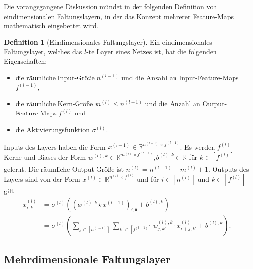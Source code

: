 \documentclass[paper=a4, 	%
		fontsize=11pt,
		abstract=true, 	%
		headsepline, 	%
		notitlepage	%
		]{scrartcl}
\theoremstyle{definition}
\newtheorem{definition}[theorem]{Definition}
\newcommand{\R}{\mathbb{R}}
\newcommand{\fNat}[1]{[ #1 ]}
\begin{document}
Die vorangegangene Diskussion mündet in der folgenden Definition von eindimensionalen Faltungslayern, in der das Konzept mehrerer Feature-Maps mathematisch eingebettet wird.

\begin{definition}[Eindimensionales Faltungslayer]\label{def:one-dimensional-conv-layer}
    Ein eindimensionales Faltungslayer, welches das $l$-te Layer eines Netzes ist, hat die folgenden Eigenschaften:
    \begin{itemize}
        \item die räumliche Input-Größe $n^{(l-1)}$ und die Anzahl an Input-Feature-Maps $f^{(l-1)}$,
        \item die räumliche Kern-Größe $m^{(l)}\leq n^{(l-1)}$ und die Anzahl an Output-Feature-Maps $f^{(l)}$ und
        \item die Aktivierungsfunktion $\sigma^{(l)}$.
    \end{itemize}
    Inputs des Layers haben die Form $x^{(l-1)}\in\R^{n^{(l-1)} \times f^{(l-1)}}$.
    Es werden $f^{(l)}$ Kerne und Biases der Form $w^{(l),k}\in\R^{m^{(l)} \times f^{(l-1)}}, b^{(l),k}\in\R$ für  $k\in \fNat{f^{(l)}}$ gelernt.
    Die räumliche Output-Größe ist $n^{(l)} = n^{(l-1)}-  m^{(l)} + 1$.
    Outputs des Layers sind von der Form $x^{(l)}\in \R^{n^{(l)}\times f^{(l)}}$ und für $i\in\fNat{n^{(l)}}$ und $k\in\fNat{f^{(l)}}$ gilt
    \begin{align*}
        x^{(l)}_{i,k}
        &=  \sigma^{(l)}\left( (w^{(l),k} \star x^{(l-1)})_{i,0} + b^{(l),k} \right)\\
        &= \sigma^{(l)} \left( 
            \sum_{j \in \fNat{n^{(l-1)}}} \sum_{k'\in \fNat{f^{(l-1)}}}
            w^{(l),k}_{j,k'} \cdot x^{(l)}_{i+j, k'} + b^{(l), k}
        \right).
    \end{align*}
\end{definition}

\subsection{Mehrdimensionale Faltungslayer}
\end{document}
